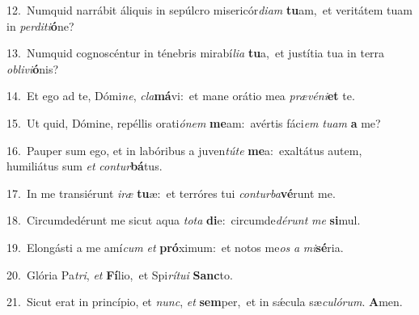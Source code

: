{\numbfont\textcolor{\numbcolor}{12.}}~Numquid narrábit áliquis in sepúlcro misericór\-\textit{di}\-\textit{am} \textbf{tu}\-am,~\star et veritátem tuam in \textit{per}\-\textit{di}\textit{ti}\textbf{ó}ne?\par
{\numbfont\textcolor{\numbcolor}{13.}}~Numquid cognoscéntur in ténebris mirabí\-\textit{li}\-\textit{a} \textbf{tu}\-a,~\star et justítia tua in terra \textit{ob}\-\textit{li}\textit{vi}\textbf{ó}nis?\par
{\numbfont\textcolor{\numbcolor}{14.}}~Et ego ad te, Dómi\-\textit{ne}\-, \textit{cla}\-\textbf{má}vi:~\star et mane orátio mea \textit{præ}\-\textit{vé}\textit{ni}\textbf{et} te.\par
{\numbfont\textcolor{\numbcolor}{15.}}~Ut quid, Dómine, repéllis orati\-\textit{ó}\-\textit{nem} \textbf{me}\-am:~\star avértis fáci\textit{em} \textit{tu}\-\textit{am} \textbf{a} me?\par
{\numbfont\textcolor{\numbcolor}{16.}}~Pauper sum ego, et in labóribus a juven\-\textit{tú}\-\textit{te} \textbf{me}\-a:~\star exaltátus autem, humiliátus sum \textit{et} \textit{con}\-\textit{tur}\textbf{bá}tus.\par
{\numbfont\textcolor{\numbcolor}{17.}}~In me transiérunt \textit{i}\-\textit{ræ} \textbf{tu}\-æ:~\star et terróres tui \textit{con}\-\textit{tur}\textit{ba}\textbf{vé}runt me.\par
{\numbfont\textcolor{\numbcolor}{18.}}~Circumdedérunt me sicut aqua \textit{to}\-\textit{ta} \textbf{di}\-e:~\star circumde\-\textit{dé}\-\textit{runt} \textit{me} \textbf{si}\-mul.\par
{\numbfont\textcolor{\numbcolor}{19.}}~Elongásti a me amí\textit{cum} \textit{et} \textbf{pró}\-ximum:~\star et notos me\textit{os} \textit{a} \textit{mi}\-\textbf{sé}ria.\par
{\numbfont\textcolor{\numbcolor}{20.}}~Glória Pa\-\textit{tri}\-, \textit{et} \textbf{Fí}\-lio,~\star et Spi\-\textit{rí}\-\textit{tu}\textit{i} \textbf{Sanc}\-to.\par
{\numbfont\textcolor{\numbcolor}{21.}}~Sicut erat in princípio, et \textit{nunc}\-, \textit{et} \textbf{sem}\-per,~\star et in sǽcula sæ\-\textit{cu}\-\textit{ló}\textit{rum}. \textbf{A}\-men.\par
